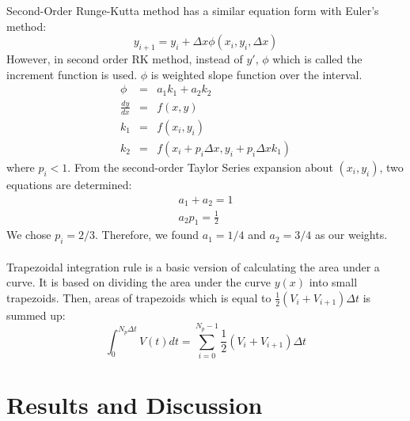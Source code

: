 \documentclass[letterpaper,12pt]{article}
\begin{document}
Second-Order Runge-Kutta method has a similar equation form with Euler's method:
\begin{equation}
y_{i+1} = y_i + \Delta x \phi (x_i , y_i, \Delta x)
\label{eq:rk2}
\end{equation}
However, in second order RK method, instead of $y\prime $, $\phi$ which is 
called the increment function is used. $\phi$ is weighted slope function over the interval.
\begin{eqnarray}
\phi&=&a_1k_1 + a_2k_2\\
\frac{dy}{dx}&=&f(x,y) \nonumber\\
k_1&=&f(x_i,y_i) \nonumber\\
k_2&=&f(x_i+p_i\Delta x, y_i+p_i\Delta x k_1) \nonumber
\end{eqnarray}
where $p_i<1$.
From the second-order Taylor Series expansion about $(x_i,y_i)$, two equations are determined:
\begin{eqnarray}
a_1+a_2 = 1  \nonumber \\
a_2p_1 = \frac{1}{2} \nonumber 
\end{eqnarray}
We chose $p_i = 2/3 $. Therefore, we found $a_1=1/4$ and $a_2=3/4$ as our weights.
\\\\
Trapezoidal integration rule is a basic version of calculating the area under a curve. It is based on
dividing the area under the curve $y(x)$ into small trapezoids. Then, areas of trapezoids which is equal to 
$\frac {1}{2}(V_i+V_{i+1})\Delta t $ is summed up:
\begin{equation}
\int_{0}^{N_p\Delta t} V(t) dt = \sum_{i=0}^{N_p-1} \frac{1}{2}(V_i+V_{i+1}) \Delta t 
\end{equation}

\newpage

\section{Results and Discussion}
\end{document}
